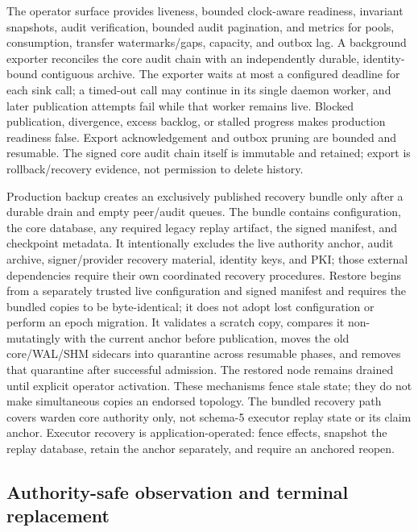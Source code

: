 \documentclass[10pt]{article}
\begin{document}
The operator surface provides liveness, bounded clock-aware readiness, invariant snapshots, audit
verification, bounded audit pagination, and metrics for pools, consumption, transfer
watermarks/gaps, capacity, and outbox lag. A background exporter reconciles the core audit chain
with an independently durable, identity-bound contiguous archive. The exporter waits at most a
configured deadline for each sink call; a timed-out call may continue in its single daemon worker,
and later publication attempts fail while that worker remains live. Blocked publication,
divergence, excess backlog, or stalled progress makes production readiness false. Export
acknowledgement and outbox pruning are bounded and resumable. The signed core audit chain itself is
immutable and retained; export is rollback/recovery evidence, not permission to delete history.

Production backup creates an exclusively published recovery bundle only after a durable drain and
empty peer/audit queues. The bundle contains configuration, the core database, any required legacy
replay artifact, the signed manifest, and checkpoint metadata. It intentionally excludes the live
authority anchor, audit archive, signer/provider recovery material, identity keys, and PKI; those
external dependencies require their own coordinated recovery procedures. Restore begins from a
separately trusted live configuration and signed manifest and requires the bundled copies to be
byte-identical; it does not adopt lost configuration or perform an epoch migration. It validates a
scratch copy, compares it non-mutatingly with the current anchor before publication, moves the old
core/WAL/SHM sidecars into quarantine across resumable phases, and removes that quarantine after
successful admission. The restored node remains drained until explicit operator activation. These
mechanisms fence stale state; they do not make simultaneous copies an endorsed topology. The
bundled recovery path covers warden core authority only, not schema-5 executor replay state or its
claim anchor. Executor recovery is application-operated: fence effects, snapshot the replay
database, retain the anchor separately, and require an anchored reopen.

\subsection{Authority-safe observation and terminal replacement}
\end{document}
